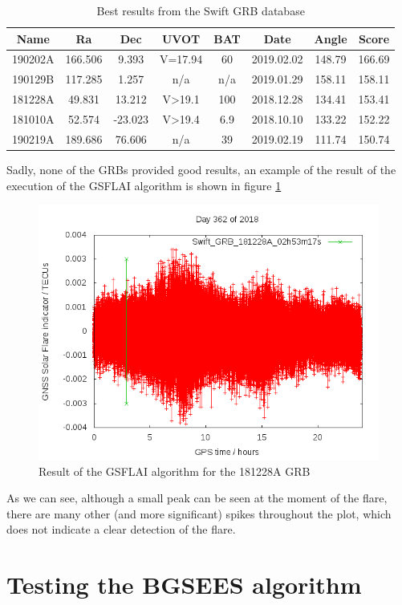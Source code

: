 \begin{table}[h!]
	\centering
	\def\arraystretch{1.2}
	\begin{tabular}{|c c c c c c c c|} 
		\hline
		Name & Ra & Dec & UVOT & BAT & Date & Angle & Score \\
		\hline\hline
		190202A & 166.506 & 9.393 & V=17.94 & 60 & 2019.02.02 & 148.79 & 166.69 \\
		\hline
		190129B & 117.285 & 1.257 & n/a & n/a & 2019.01.29 & 158.11 & 158.11 \\
		\hline
		181228A & 49.831 & 13.212 & V>19.1 & 100 & 2018.12.28 & 134.41 & 153.41 \\
		\hline
		181010A & 52.574 & -23.023 & V>19.4 & 6.9 & 2018.10.10 & 133.22 & 152.22 \\
		\hline
		190219A & 189.686 & 76.606 & n/a & 39 & 2019.02.19 & 111.74 & 150.74 \\
		\hline
	\end{tabular}
	\caption{Best results from the Swift GRB database}
\end{table}

Sadly, none of the GRBs provided good results, an example of the result of the execution of the GSFLAI algorithm is shown in figure \ref{fig:gsflai}

\begin{figure}[!htb]
	\begin{centering}
		\includegraphics[width=0.5\linewidth]{images/swift/gsflai.png}
		\caption{Result of the GSFLAI algorithm for the 181228A GRB}
		\label{fig:gsflai}
	\end{centering}
\end{figure}

As we can see, although a small peak can be seen at the moment of the flare, there are many other (and more significant) spikes throughout the plot, which does not indicate a clear detection of the flare.

\clearpage

\section{Testing the BGSEES algorithm}

